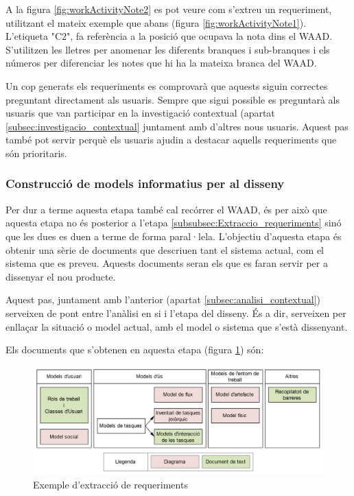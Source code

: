 A la figura \ref{fig:workActivityNote2} es pot veure com s'extreu un requeriment, utilitzant el mateix exemple que abans (figura \ref{fig:workActivityNote1}). L'etiqueta "C2", fa referència a la posició que ocupava la nota dins el \ac{WAAD}. S'utilitzen les lletres per anomenar les diferents branques i sub-branques i els números per diferenciar les notes que hi ha la mateixa branca del \ac{WAAD}.

Un cop generats els requeriments es comprovarà que aquests siguin correctes preguntant directament als usuaris. Sempre que sigui possible es preguntarà als usuaris que van participar en la investigació contextual (apartat \ref{subsec:investigacio_contextual} juntament amb d'altres nous usuaris. Aquest pas també pot servir perquè els usuaris ajudin a destacar aquells requeriments que són prioritaris.

\subsubsection{Construcció de models informatius per al disseny}\label{subsubsec:Construccio_models}
Per dur a terme aquesta etapa també cal recórrer el \ac{WAAD}, és per això que aquesta etapa no és posterior a l'etapa \ref{subsubsec:Extraccio_requeriments} sinó que les dues es duen a terme de forma paral·lela. L'objectiu d'aquesta etapa és obtenir una sèrie de documents que descriuen tant el sistema actual, com el sistema que es preveu. Aquests documents seran els que es faran servir per a dissenyar el nou producte.

Aquest pas, juntament amb l'anterior (apartat \ref{subsec:analisi_contextual}) serveixen de pont entre l'anàlisi en si i l'etapa del disseny. És a dir, serveixen per enllaçar la situació o model actual, amb el model o sistema que s'està dissenyant.

Els documents que s'obtenen en aquesta etapa (figura \ref{fig:design-informing_models}) són: 
\begin{figure}[ht]
\centering
\includegraphics[scale=0.75]{Design-informing_models.png}
\caption{Exemple d'extracció de requeriments}\label{fig:design-informing_models}
\end{figure}

